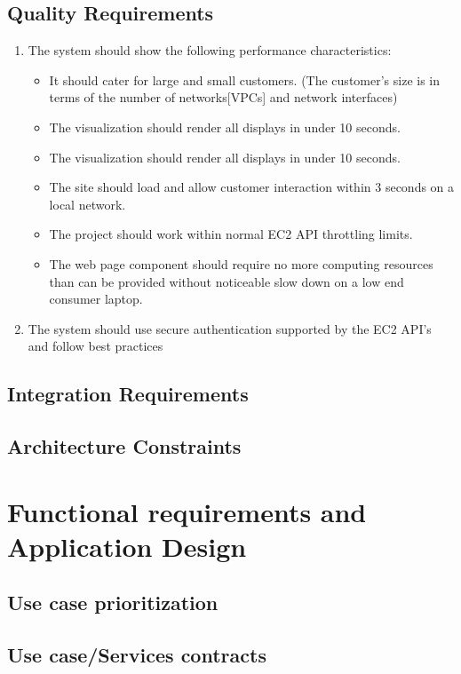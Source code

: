 \documentclass[a4paper,12pt]{report}
\begin{document}
	\subsection{Quality Requirements}
	\begin{enumerate}
		\item The system should show the following performance characteristics:
		\begin{itemize}
			\item It should cater for large and small customers. (The customer's size is in terms of the number of networks[VPCs] and network interfaces)
			\item The visualization should render all displays in under 10 seconds.
			\item The visualization should render all displays in under 10 seconds.
			\item The site should load and allow customer interaction within 3 seconds on a local network.
			\item The project should work within normal EC2 API throttling limits.
			\item The web page component should require no more computing resources than can be provided without noticeable slow down on a low end consumer laptop.
		\end{itemize}
		\item The system should use secure authentication supported by the EC2 API's and follow best practices 
	\end{enumerate}
	
	\subsection{Integration Requirements}
	\subsection{Architecture Constraints}
\section{Functional requirements and Application Design}
	\subsection{Use case prioritization}
	\subsection{Use case/Services contracts}
\end{document}
